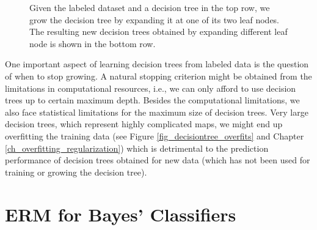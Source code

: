 \documentclass[12pt]{report}
\begin{document}
\begin{figure}[htbp]
\begin{minipage}{0.25\textwidth}
{}
\end{minipage}
\caption{Given the labeled dataset and a decision tree in the top row, 
	we grow the decision tree by expanding it at one of 
	its two leaf nodes. The resulting new decision trees 
	obtained by expanding different leaf node is shown 
	in the bottom row.}
\label{fig_growingatree}
\end{figure}
 
One important aspect of learning decision trees from labeled 
data is the question of when to stop growing. A natural stopping 
criterion might be obtained from the limitations in computational 
resources, i.e., we can only afford to use decision trees up to 
certain maximum depth. Besides the computational limitations, 
we also face statistical limitations for the maximum size of decision 
trees. Very large decision trees, which represent 
highly complicated maps, we might end up overfitting the training 
data (see Figure \ref{fig_decisiontree_overfits} and Chapter \ref{ch_overfitting_regularization}) 
which is detrimental to the prediction performance of decision 
trees obtained for new data (which has not been used for training 
or growing the decision tree). 
 
 \section{ERM for Bayes' Classifiers} 
 \label{sec_ERM_Bayes} 
 
\end{document}
